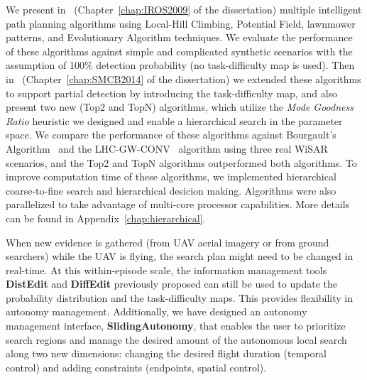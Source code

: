 We present in~\cite{Lin2009UAV} (Chapter~\ref{chap:IROS2009} of the dissertation) multiple intelligent path planning algorithms using Local-Hill Climbing, Potential Field, lawnmower patterns, and Evolutionary Algorithm techniques. We evaluate the performance of these algorithms against simple and complicated synthetic scenarios with the assumption of 100\% detection probability (no task-difficulty map is used). Then in~\cite{Lin2014Hierarchical} (Chapter~\ref{chap:SMCB2014} of the dissertation) we extended these algorithms to support partial detection by introducing the task-difficulty map, and also present two new (Top2 and TopN) algorithms, which utilize the \textit{Mode Goodness Ratio} heuristic we designed and enable a hierarchical search in the parameter space. We compare the performance of these algorithms against Bourgault's Algorithm~\cite{Bourgault2006Optimal} and the LHC-GW-CONV~\cite{Lin2009UAV} algorithm using three real WiSAR scenarios, and the Top2 and TopN algorithms outperformed both algorithms. To improve computation time of these algorithms, we implemented hierarchical coarse-to-fine search and hierarchical desicion making. Algorithms were also parallelized to take advantage of multi-core processor capabilities. More details can be found in Appendix~\ref{chap:hierarchical}.

When new evidence is gathered (from UAV aerial imagery or from ground searchers) while the UAV is flying, the search plan might need to be changed in real-time. At this within-episode scale, the information management tools \textbf{DistEdit} and \textbf{DiffEdit} previously proposed can still be used to update the probability distribution and the task-difficulty maps. This provides flexibility in autonomy management. Additionally, we have designed an autonomy management interface, \textbf{SlidingAutonomy}, that enables the user to prioritize search regions and manage the desired amount of the autonomous local search along two new dimensions: changing the desired flight duration (temporal control) and adding constraints (endpoints, spatial control).

